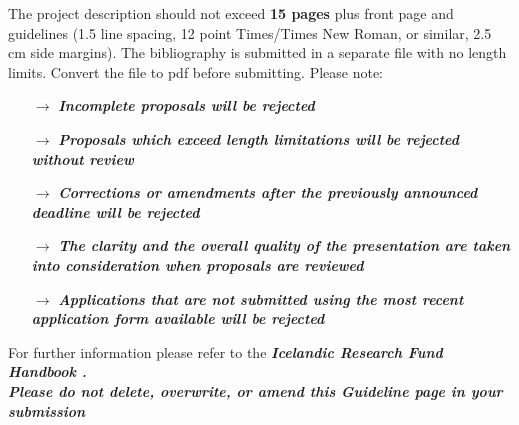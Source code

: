 \noindent
The project description should not exceed \textbf{15 pages} plus
front page and guidelines (1.5 line spacing, 12 point Times/Times New
Roman, or similar, 2.5 cm side margins). The \mbox{bibliography} is submitted
in a separate file with no length limits. Convert the file to pdf before submitting. Please note:

\begin{itemize}
\setlength\itemsep{-0.5em}
\item[$\rightarrow$]
  \emph{\textbf{Incomplete proposals will be rejected}}
\item[$\rightarrow$]
  \emph{\textbf{Proposals which exceed length limitations will be
  rejected without review}}
\item[$\rightarrow$]
  \emph{\textbf{Corrections or amendments after the previously announced
  deadline will be rejected}}
\item[$\rightarrow$]
  \emph{\textbf{The clarity and the overall quality of the presentation
  are taken into consideration when proposals are reviewed}}
\item[$\rightarrow$]
  \emph{\textbf{Applications that are not submitted using the most
  recent application form available will be rejected}}\\
\end{itemize}

\noindent
For further information please refer to the \emph{\textbf{Icelandic
Research Fund Handbook \theproposalyear.}}\\

\emph{\textbf{Please do not delete, overwrite, or amend this Guideline
page in your submission\\
}}

\newpage

